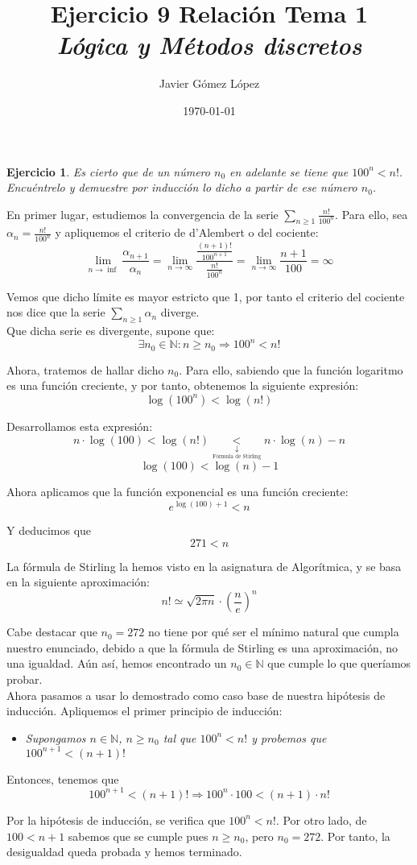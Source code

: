 \documentclass[a4paper, 12pt]{article}
\title{\textbf{Ejercicio 9 Relación Tema 1} \\ \textit{Lógica y Métodos discretos}}
\author{Javier Gómez López}
\date{\today}
\newtheorem{ej}{Ejercicio}
\begin{document}
\maketitle

\setcounter{ej}{8}

\begin{ej}
Es cierto que de un número \(n_0\) en adelante se tiene que \(100^n < n!\). Encuéntrelo y demuestre por inducción lo dicho a partir de ese número \(n_0\).
\end{ej}

En primer lugar, estudiemos la convergencia de la serie \(\sum_{n \geq 1} \frac{n!}{100^n}\). Para ello, sea \(\alpha_n = \frac{n!}{100^n}\) y apliquemos el criterio de d'Alembert o del cociente: 
\[
	\lim_{n \to \inf} \frac{\alpha_{n+1}}{\alpha_n} = \lim_{n \to \infty} \frac{\frac{(n+1)!}{100^{n+1}}}{\frac{n!}{100^n}} = \lim_{n \to \infty} \frac{n+1}{100} = \infty
\]

Vemos que dicho límite es mayor estricto que 1, por tanto el criterio del cociente nos dice que la serie \(\sum_{n \geq 1} \alpha_n\) diverge. \\

Que dicha serie es divergente, supone que:
\[
	\exists n_0 \in \mathbb{N} : n \geq n_0 \Rightarrow 100^n < n!
\]

Ahora, tratemos  de hallar dicho \(n_0\). Para ello, sabiendo que la función logaritmo es una función creciente, y por tanto, obtenemos la siguiente expresión:
\[
	\log (100^n) < \log (n!)
\]

Desarrollamos esta expresión:
\[
	n \cdot \log (100) < \log (n!) \underset{\underset{\text{Fórmula de Stirling}}{\downarrow}}{<} n \cdot \log (n) - n
\]
\[
	\log (100) < \log (n) -1
\]

Ahora aplicamos que la función exponencial es una función creciente:
\[
	e^{\log (100) + 1} < n
\]

Y deducimos que 
\[
	271 < n
\]

La fórmula de Stirling la hemos visto en la asignatura de Algorítmica, y se basa en la siguiente aproximación:
\[
	n! \simeq \sqrt{2 \pi n} \cdot \left( \frac{n}{e} \right)^n
\]

Cabe destacar que \(n_0 = 272\) no tiene por qué ser el mínimo natural que cumpla nuestro enunciado, debido a que la fórmula de Stirling es una aproximación, no una igualdad. Aún así, hemos encontrado un \(n_0 \in \mathbb{N}\) que cumple lo que queríamos probar. \\

Ahora pasamos a usar lo demostrado como caso base de nuestra hipótesis de inducción. Apliquemos el primer principio de inducción:
\begin{itemize}
	\item \textit{Supongamos \(n \in \mathbb{N}\), \(n \geq n_0\) tal que \(100^n < n!\) y probemos que \(100^{n+1} < (n+1)!\)}
\end{itemize}

Entonces, tenemos que 
\[
	100^{n+1} < (n+1)! \Rightarrow 100^n \cdot 100 < (n+1) \cdot n!
\]

Por la hipótesis de inducción, se verifica que \(100^n < n!\). Por otro lado, de \(100 < n +1\) sabemos que se cumple pues \(n \geq n_0\), pero \(n_0 = 272\). Por tanto, la desigualdad queda probada y hemos terminado.
\end{document}

